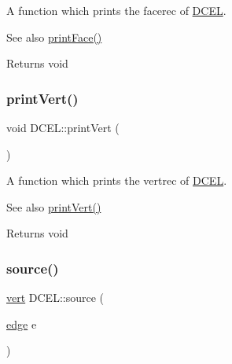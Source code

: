 A function which prints the facerec of \hyperlink{class_d_c_e_l}{D\+C\+EL}. 

\begin{DoxySeeAlso}{See also}
\hyperlink{class_d_c_e_l_a02d6d3ab8652a6d7cd1bd4488bbec5de}{print\+Face()} 
\end{DoxySeeAlso}
\begin{DoxyReturn}{Returns}
void 
\end{DoxyReturn}
\mbox{\label{class_d_c_e_l_a6c1af27ae2c0bf06abb206e64ac517a2}} 
\subsubsection{\texorpdfstring{print\+Vert()}{printVert()}}
{\footnotesize\ttfamily void D\+C\+E\+L\+::print\+Vert (\begin{DoxyParamCaption}{ }\end{DoxyParamCaption})\hspace{0.3cm}{\ttfamily [inline]}}



A function which prints the vertrec of \hyperlink{class_d_c_e_l}{D\+C\+EL}. 

\begin{DoxySeeAlso}{See also}
\hyperlink{class_d_c_e_l_a6c1af27ae2c0bf06abb206e64ac517a2}{print\+Vert()} 
\end{DoxySeeAlso}
\begin{DoxyReturn}{Returns}
void 
\end{DoxyReturn}
\mbox{\label{class_d_c_e_l_aefc1eac40e592c8616801c02b5f45545}} 
\subsubsection{\texorpdfstring{source()}{source()}}
{\footnotesize\ttfamily \hyperlink{_polygon_triangulation_8h_a15bccd83c1e570e4a0ff17c42152989b}{vert} D\+C\+E\+L\+::source (\begin{DoxyParamCaption}\item[{\hyperlink{_polygon_triangulation_8h_a4ef43ff5c6d42dacbc8ffd9c8cfdc189}{edge}}]{e }\end{DoxyParamCaption})\hspace{0.3cm}{\ttfamily [inline]}}



